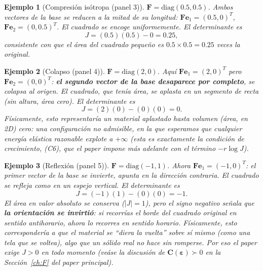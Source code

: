 \documentclass[11pt,a4paper]{article}
\newtheorem{ejemplo}{Ejemplo}
\begin{document}
\begin{ejemplo}[Compresi\'on is\'otropa (panel 3)]
$\bm F=\mathrm{diag}(0.5,0.5)$. Ambos vectores de la base se
\emph{reducen} a la mitad de su longitud:
$\bm F\bm e_1=(0.5,0)^T$, $\bm F\bm e_2=(0,0.5)^T$. El cuadrado se
encoge uniformemente. El determinante es
\[
 J=(0.5)(0.5)-0=0.25,
\]
consistente con que el \'area del cuadrado peque\~no es
$0.5\times0.5=0.25$ veces la original.
\end{ejemplo}

\begin{ejemplo}[Colapso (panel 4)]
$\bm F=\mathrm{diag}(2,0)$. Aqu\'i $\bm F\bm e_1=(2,0)^T$ pero
$\bm F\bm e_2=(0,0)^T$: \textbf{el segundo vector de la base
desaparece por completo}, se colapsa al origen. El cuadrado, que
ten\'ia \'area, se aplasta en un segmento de recta (sin altura,
\'area cero). El determinante es
\[
 J=(2)(0)-(0)(0)=0.
\]
F\'isicamente, esto representar\'ia un material aplastado hasta
volumen (\'area, en 2D) cero: una configuraci\'on \emph{no admisible},
en la que esperamos que cualquier energ\'ia el\'astica razonable
explote a $+\infty$ (esta es exactamente la condici\'on de crecimiento,
(C6), que el paper impone m\'as adelante con el t\'ermino $-r\log J$).
\end{ejemplo}

\begin{ejemplo}[Reflexi\'on (panel 5)]
$\bm F=\mathrm{diag}(-1,1)$. Ahora $\bm F\bm e_1=(-1,0)^T$: el primer
vector de la base \emph{se invierte}, apunta en la direcci\'on
contraria. El cuadrado se refleja como en un espejo vertical. El
determinante es
\[
 J=(-1)(1)-(0)(0)=-1.
\]
El \'area en valor absoluto se conserva ($|J|=1$), pero el signo
negativo señala que \textbf{la orientaci\'on se invirti\'o}: si
recorr\'ias el borde del cuadrado original en sentido antihorario,
ahora lo recorres en sentido horario. F\'isicamente, esto
corresponder\'ia a que el material se ``diera la vuelta'' sobre s\'i
mismo (como una tela que se voltea), algo que un s\'olido real no
hace sin romperse. Por eso el paper exige $J>0$ en todo momento (ve\'ase
la discusi\'on de $\bm C(\bm\varepsilon)\succ0$ en la
Secci\'on~\ref{ch:F} del paper principal).
\end{ejemplo}
\end{document}
